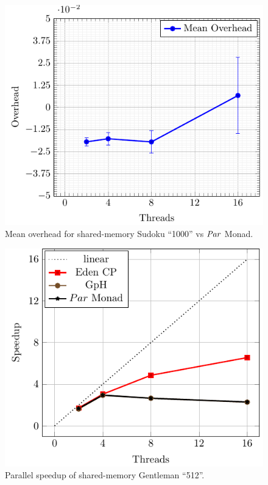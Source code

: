 \documentclass[paper=A4,twoside=true,openright,parskip=full,chapterprefix=true,headings=normal,bibliography=totoc,listof=totoc,titlepage=on,captions=tableabove,draft=false,british]{scrreprt}%
\renewcommand{\enquote}[1]{{``}#1{''}}
\begin{document}
\begin{figure}[h]
\centering
\includegraphics{src/img/overSMSudokuPar.pdf}
\caption{Mean overhead for shared-memory Sudoku \enquote{1000} vs \ensuremath{\Conid{Par}}
Monad.\label{fig:overSMSudokuPar}}
\end{figure}

\begin{figure}[h]
\centering
\includegraphics{src/img/perfSMTorus.pdf}
\caption{Parallel speedup of shared-memory Gentleman
\enquote{512}.\label{fig:perfSMTorus}}
\end{figure}
\end{document}
